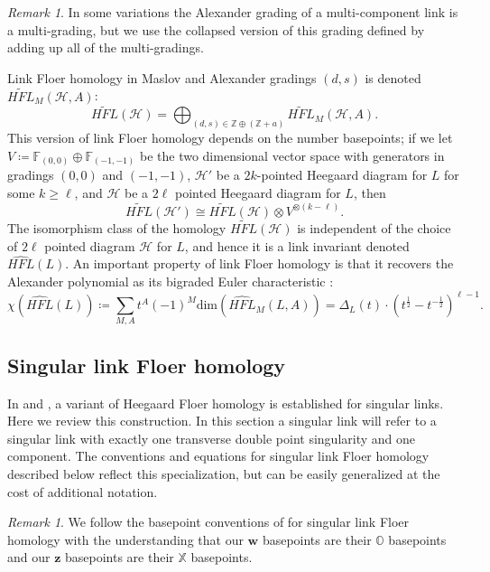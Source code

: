 \documentclass[11pt]{amsart}
\theoremstyle{definition}
\theoremstyle{remark}
\newtheorem{remark}[theorem]{Remark}
\def\F{\mathbb{F}}
\def\Z{\mathbb{Z}}
\def\HFL{\mathit{HFL}}
\newcommand\HFLhat{\widehat{\HFL}}
\numberwithin{equation}{section}
\begin{document}
\begin{remark}
    In some variations the Alexander grading of a multi-component link is a multi-grading, but we use the collapsed version of this grading defined by adding up all of the multi-gradings.
\end{remark}Link Floer homology in Maslov and Alexander gradings $(d,s)$ is denoted $\widetilde{HFL}_M(\mathcal{H},A)$:
\begin{equation}
    \widetilde{HFL}(\mathcal{H})=\bigoplus_{(d,s)\in \Z\oplus (\Z+a)} \widetilde{HFL}_M(\mathcal{H},A).
\end{equation}This version of link Floer homology depends on the number basepoints; if we let $V\coloneq \F_{(0,0)}\oplus \F_{(-1,-1)}$ be the two dimensional vector space with generators in gradings $(0,0)$ and $(-1,-1)$, $\mathcal{H}'$ be a $2k$-pointed Heegaard diagram for $L$ for some $k\ge \ell$, and $\mathcal{H}$ be a $2\ell$ pointed Heegaard diagram for $L$, then 
\begin{equation}\label{HFKdependencyonbp}
    \widetilde{HFL}(\mathcal{H}')\cong\widetilde{HFL}(\mathcal{H})\otimes V^{\otimes(k-\ell)}.
\end{equation}
The isomorphism class of the homology $\widetilde{HFL}(\mathcal{H})$ is independent of the choice of $2\ell$ pointed diagram $\mathcal{H}$ for $L$, and hence it is a link invariant denoted $\HFLhat(L)$. An important property of link Floer homology is that it recovers the Alexander polynomial as its bigraded Euler characteristic \cite[~Theorem 1.3]{OSSlink}:
\begin{equation}\label{HFLeulerchar}
    \chi(\HFLhat(L))\coloneq \sum_{M,A}t^A(-1)^M\text{dim}(\HFLhat_M(L,A))=\Delta_L(t)\cdot(t^{\frac{1}{2}}-t^{-\frac{1}{2}})^{\ell-1}.
\end{equation}

\subsection{Singular link Floer homology}\label{singularlinkFloer}
In \cite{OSsing1} and \cite{OSsing2}, 
a variant of Heegaard Floer homology is established for singular links. Here we review this construction. In this section a singular link will refer to a singular link with exactly one transverse double point singularity and one component. The conventions and equations for singular link Floer homology described below reflect this specialization, but can be easily generalized at the cost of additional notation.
\begin{remark}
    We follow the basepoint conventions of \cite{OSsing2} for singular link Floer homology with the understanding that our $\bm{w}$ basepoints are their $\mathbb{O}$ basepoints and our $\bm{z}$ basepoints are their $\mathbb{X}$ basepoints. 
\end{remark}
\end{document}
